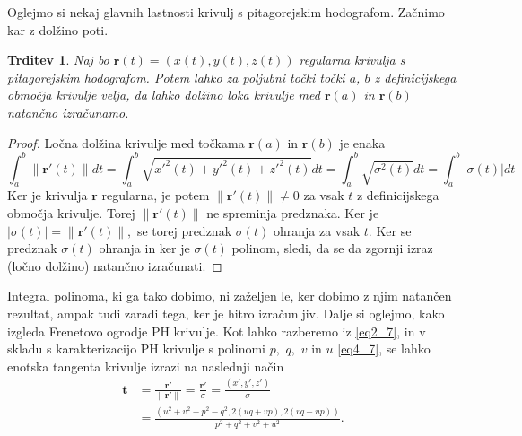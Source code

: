 \documentclass[12pt,a4paper,twoside]{article}
\theoremstyle{definition} %
\theoremstyle{plain} %
\newtheorem{trditev}[definicija]{Trditev}
\numberwithin{equation}{section}  %
\begin{document}
Oglejmo si nekaj glavnih lastnosti krivulj s pitagorejskim hodografom. Začnimo kar z dolžino poti.
\begin{trditev}
	Naj bo $\mathbf{r}(t)=(x(t),y(t),z(t))$ regularna krivulja s pitagorejskim hodografom. Potem lahko za poljubni točki točki $a$, $b$ z definicijskega območja krivulje velja, da lahko dolžino loka krivulje med $\mathbf{r}(a)$ in $\mathbf{r}(b)$ natančno izračunamo.
\end{trditev}
\begin{proof}
	Ločna dolžina krivulje med točkama $\mathbf{r}(a)$ in $\mathbf{r}(b)$ je enaka
	\begin{equation}
		\int_a^b\lVert \mathbf{r'}(t) \rVert dt=\int_a^b\sqrt{x'^2(t)+y'^2(t)+z'^2(t)}dt=\int_a^b\sqrt{\sigma^2(t)}dt=\int_a^b|\sigma(t)|dt
	\end{equation}
	Ker je krivulja $\mathbf{r}$ regularna, je potem $\lVert \mathbf{r'}(t) \rVert \neq 0$ za vsak $t$ z definicijskega območja krivulje. Torej $\lVert \mathbf{r'}(t) \rVert$ ne spreminja predznaka. Ker je $|\sigma(t)|=\lVert \mathbf{r'}(t) \rVert,$ se torej predznak $\sigma(t)$ ohranja za vsak $t.$ Ker se predznak $\sigma(t)$ ohranja in ker je $\sigma(t)$ polinom, sledi, da se da zgornji izraz (ločno dolžino) natančno izračunati.
\end{proof}

Integral polinoma, ki ga tako dobimo, ni zaželjen le, ker dobimo z njim natančen rezultat, ampak tudi zaradi tega, ker je hitro izračunljiv. Dalje si oglejmo, kako izgleda Frenetovo ogrodje PH krivulje. Kot lahko razberemo iz \eqref{eq2_7}, in v skladu s karakterizacijo PH krivulje s polinomi $p,$ $q,$ $v$ in $u$ \eqref{eq4_7}, se lahko enotska tangenta krivulje izrazi na naslednji način
\begin{align}
	\mathbf{t}&=\frac{\mathbf{r'}}{\lVert \mathbf{r'} \rVert}=\frac{\mathbf{r'}}{\sigma}=\frac{(x',y',z')}{\sigma} \nonumber \\
	&=\frac{(u^2+v^2-p^2-q^2,2(uq+vp),2(vq-up))}{p^2+q^2+v^2+u^2}.
\end{align}
\end{document}
